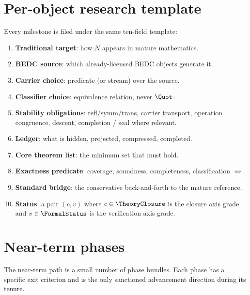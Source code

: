\section{Per-object research template}
\label{sec:roadmap-per-object-template}

Every milestone is filed under the same ten-field template:
\begin{enumerate}
  \item \textbf{Traditional target}: how $N$ appears in mature mathematics.
  \item \textbf{BEDC source}: which already-licensed BEDC objects generate it.
  \item \textbf{Carrier choice}: predicate (or stream) over the source.
  \item \textbf{Classifier choice}: equivalence relation, never $\Quot$.
  \item \textbf{Stability obligations}: refl/symm/trans, carrier transport, operation congruence, descent, completion / seal where relevant.
  \item \textbf{Ledger}: what is hidden, projected, compressed, completed.
  \item \textbf{Core theorem list}: the minimum set that must hold.
  \item \textbf{Exactness predicate}: coverage, soundness, completeness, classification $\iff$.
  \item \textbf{Standard bridge}: the conservative back-and-forth to the mature reference.
  \item \textbf{Status}: a pair $(c, v)$ where $c \in \TheoryClosure$ is the closure axis grade and $v \in \FormalStatus$ is the verification axis grade.
\end{enumerate}

\section{Near-term phases}
\label{sec:roadmap-near-term-phases}

The near-term path is a small number of phase bundles. Each phase has a specific exit criterion and is the only sanctioned advancement direction during its tenure.

